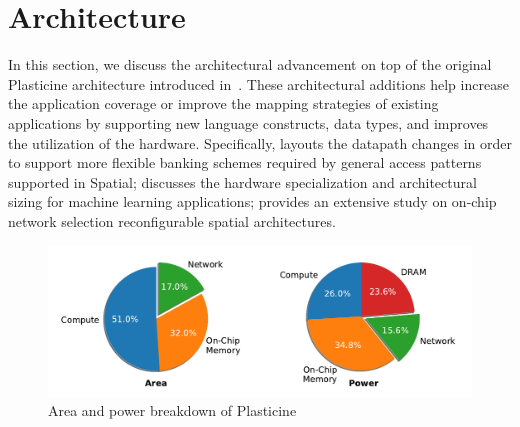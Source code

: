 \chapter{Architecture} \label{sec:arch}

In this section, we discuss the architectural advancement on top of the original Plasticine architecture
introduced in~\cite{plasticine}. These architectural additions help increase the application
coverage or improve the mapping strategies of existing applications by supporting new language
constructs, data types, and improves the utilization of the hardware. 
Specifically,  layouts the datapath changes in order to support more
flexible banking schemes required by general access patterns supported in Spatial; 
 discusses the hardware specialization and architectural sizing for machine
learning applications;  provides an extensive study on on-chip network selection 
reconfigurable spatial architectures.

\begin{figure}
\centering
\includegraphics[width=1\textwidth]{figs/pie.pdf}
\caption[Area and power breakdown of Plasticine]{
  Area and power breakdown of Plasticine
}
\label{fig:breakdown}
\end{figure}




%
%
%
